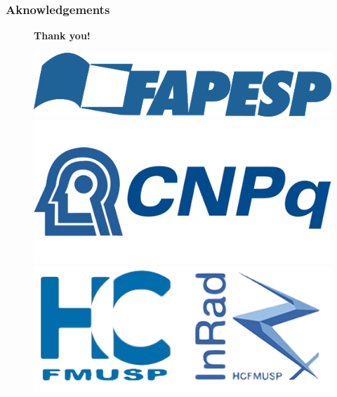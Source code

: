 \begin{frame}
    \frametitle{Aknowledgements}
    \begin{figure}
        \begin{minipage}{0.6\textwidth}
            \centering
            \huge{\textbf{Thank you!}}
        \end{minipage}\hfill
        \begin{minipage}{0.4\textwidth}
            \centering
            \begin{minipage}{0.35\textheight}
                \includegraphics[width=\linewidth,height=1\textheight,keepaspectratio]{Figures/fapesp.png}                
            \end{minipage}
            \begin{minipage}{0.35\textheight}
                \includegraphics[width=\linewidth,height=1\textheight,keepaspectratio]{Figures/cnpq.png}
            \end{minipage}
            \begin{minipage}{0.35\textheight}
                \includegraphics[width=\linewidth,height=1\textheight,keepaspectratio]{InradFrametitle.png}
            \end{minipage}
        \end{minipage}
    \end{figure}
\end{frame}